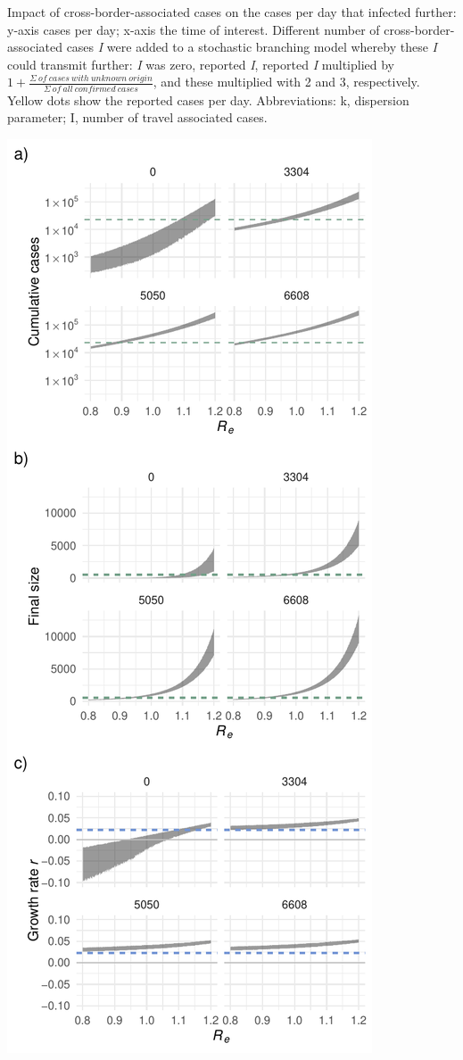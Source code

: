 \documentclass[10pt, a4paper, twoside]{article}
\begin{document}
\begin{suppfigure}[h]
\caption{Impact of cross-border-associated cases on the cases per day that infected further: y-axis cases per day; x-axis the time of interest. Different number of cross-border-associated cases \emph{I} were added to a stochastic branching model whereby these \emph{I} could transmit further: \emph{I} was zero, reported \emph{I}, reported \emph{I} multiplied by $1+ \frac{\Sigma ~of ~cases ~with ~unknown ~origin }{\Sigma ~of ~all ~confirmed ~cases}$, and these multiplied with 2 and 3, respectively. Yellow dots show the reported cases per day. Abbreviations: k, dispersion parameter; I, number of travel associated cases.}
\label{sf1}
\end{suppfigure}

\clearpage
\begin{suppfigure}[h]
\centering
\includegraphics[scale=0.6]{SF2_2021-04-19.pdf}

\end{suppfigure}
\end{document}
